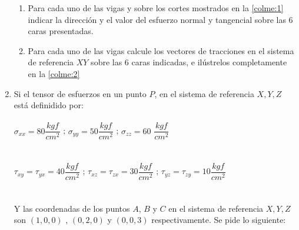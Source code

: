 \documentclass[../notas medios.tex]{subfiles}
\begin{document}
\begin{enumerate}
\begin{enumerate}
	\item Para cada uno de las vigas y sobre los cortes mostrados en la \cref{colme:1} indicar la direcci\'on y el valor del esfuerzo normal y tangencial sobre las 6 caras presentadas. 
	\item Para cada uno de las vigas calcule los vectores de tracciones en el sistema de referencia $ X Y$ sobre las 6 caras indicadas, e il\'ustrelos completamente en la \cref{colme:2}
\end{enumerate}

\begin{figure}[H]
	\centering
		\hspace{2.0cm}
	\caption{ }
\end{figure}

\item \label{punto18} Si el tensor de esfuerzos en un punto $P$, en el sistema
de referencia $X,Y,Z$ est\'a definidido por:\\\\
\hspace*{10mm} $ \sigma_{xx} = 80\dfrac{kgf}{cm^2}$ \hspace*{5mm} ;   \hspace*{5mm} $\sigma_{yy} = 50\dfrac{kgf}{cm^2}$\hspace*{5mm} ;\hspace*{5mm} $\sigma_{zz} = 60$ $\dfrac{kgf}{cm^2}$\\\\
\\
	\hspace*{10mm}  $ \tau_{xy} = \tau_{yx} =40\dfrac{kgf}{cm^2}$ \hspace*{5mm}; \hspace*{5mm}$\tau_{xz} = \tau_{zx} =30\dfrac{kgf}{cm^2}$\hspace*{5mm} ;\hspace*{5mm} $\tau_{yz} = \tau_{zy} = 10 \dfrac{kgf}{cm^2}$\\\\	
\\	
Y las coordenadas de los puntos $A$, $B$ y $C$  en el sistema de referencia $X,Y,Z$  son   $(1,0,0)$ , $(0,2,0)$ y $(0,0,3)$  respectivamente. Se pide lo siguiente:


\end{enumerate}
\end{document}

